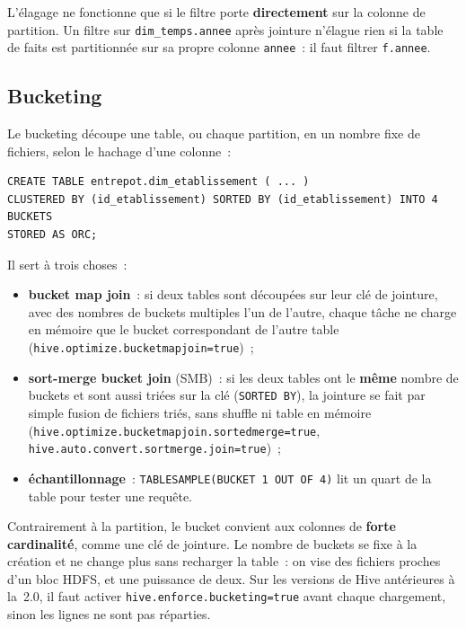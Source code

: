 \vspace{0.2cm}

\noindent L'élagage ne fonctionne que si le filtre porte \textbf{directement} sur la colonne de partition. Un filtre sur \texttt{dim\_temps.annee} après jointure n'élague rien si la table de faits est partitionnée sur sa propre colonne \texttt{annee}~: il faut filtrer \texttt{f.annee}.

\subsection{Bucketing}

\noindent Le bucketing découpe une table, ou chaque partition, en un nombre fixe de fichiers, selon le hachage d'une colonne~:

\begin{center}
\begin{minipage}{0.92\textwidth}
\begin{tcolorbox}[colback=title2!6,colframe=title1,boxsep=2pt]
\begin{verbatim}
CREATE TABLE entrepot.dim_etablissement ( ... )
CLUSTERED BY (id_etablissement) SORTED BY (id_etablissement) INTO 4 BUCKETS
STORED AS ORC;
\end{verbatim}
\end{tcolorbox}
\end{minipage}
\end{center}

\noindent Il sert à trois choses~:
\begin{itemize}
	\item \textbf{bucket map join}~: si deux tables sont découpées sur leur clé de jointure, avec des nombres de buckets multiples l'un de l'autre, chaque tâche ne charge en mémoire que le bucket correspondant de l'autre table (\texttt{hive.optimize.bucketmapjoin=true})~;
	\item \textbf{sort-merge bucket join} (SMB)~: si les deux tables ont le \textbf{même} nombre de buckets et sont aussi triées sur la clé (\texttt{SORTED BY}), la jointure se fait par simple fusion de fichiers triés, sans shuffle ni table en mémoire (\texttt{hive.optimize.bucketmapjoin.sortedmerge=true}, \texttt{hive.auto.convert.sortmerge.join=true})~;
	\item \textbf{échantillonnage}~: \texttt{TABLESAMPLE(BUCKET 1 OUT OF 4)} lit un quart de la table pour tester une requête.
\end{itemize}

\noindent Contrairement à la partition, le bucket convient aux colonnes de \textbf{forte cardinalité}, comme une clé de jointure. Le nombre de buckets se fixe à la création et ne change plus sans recharger la table~: on vise des fichiers proches d'un bloc HDFS, et une puissance de deux. Sur les versions de Hive antérieures à la~2.0, il faut activer \texttt{hive.enforce.bucketing=true} avant chaque chargement, sinon les lignes ne sont pas réparties.

